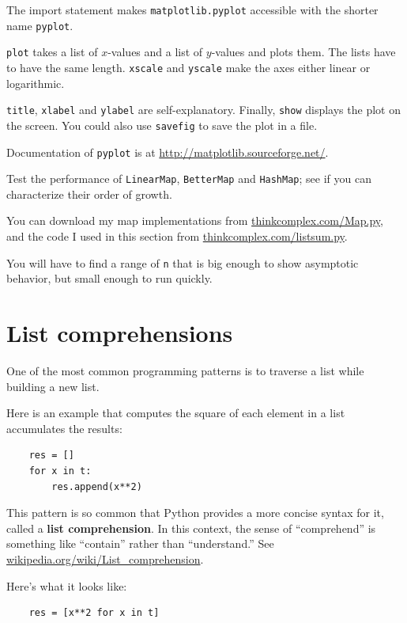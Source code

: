 \documentclass[10pt]{book}
\begin{document}
The import statement makes {\tt matplotlib.pyplot} accessible
with the shorter name {\tt pyplot}.

{\tt plot} takes a list of $x$-values and a list of $y$-values and
plots them.  The lists have to have the same length.
{\tt xscale} and {\tt yscale} make the axes either linear or logarithmic.

{\tt title}, {\tt xlabel} and {\tt ylabel} are self-explanatory.
Finally, {\tt show} displays the plot on the screen.  You could also
use {\tt savefig} to save the plot in a file.

Documentation of {\tt pyplot} is at \url{http://matplotlib.sourceforge.net/}.


\begin{exercise}

Test the performance of
{\tt LinearMap}, {\tt BetterMap} and {\tt HashMap}; see if you
can characterize their order of growth.

You can download my map implementations from
\url{thinkcomplex.com/Map.py}, and the code I used in this section
from \url{thinkcomplex.com/listsum.py}.

You will have to find a range
of {\tt n} that is big enough to show asymptotic behavior, but small
enough to run quickly.

\end{exercise}


\section{List comprehensions}

One of the most common programming patterns is to traverse
a list while building a new list.

Here is an example that computes the square of each element in
a list accumulates the results:

\begin{verbatim}
    res = []
    for x in t:
        res.append(x**2)
\end{verbatim}

This pattern is so common that Python provides a more
concise syntax for it, called a {\bf list comprehension}.
In this context, the sense of ``comprehend'' is something
  like ``contain'' rather than ``understand.''  See
  \url{wikipedia.org/wiki/List_comprehension}.

Here's what it looks like:

\begin{verbatim}
    res = [x**2 for x in t]
\end{verbatim}
\end{document}
